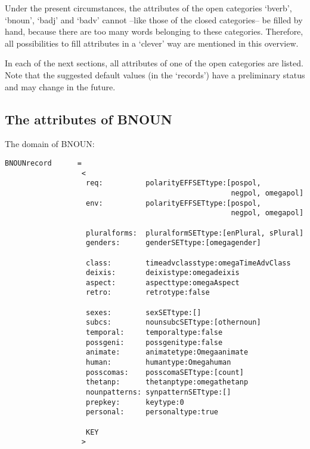Under the present circumstances, the attributes of the open categories `bverb',
`bnoun', `badj' and `badv' cannot 
--like those of the closed categories-- be filled by hand, because there are 
too many words belonging to these categories. Therefore, all possibilities to
fill attributes in a `clever' way are mentioned in this overview. 
 
In each of the next sections, all attributes of one of the open categories are 
listed. Note that the suggested default values (in the `records') 
have a preliminary status and may change in the future. 
 
\subsection{The attributes of BNOUN}
 
The domain of BNOUN:
 
\begin{verbatim}
BNOUNrecord      =
                  <
                   req:          polarityEFFSETtype:[pospol, 
                                                     negpol, omegapol]
                   env:          polarityEFFSETtype:[pospol, 
                                                     negpol, omegapol]
 
                   pluralforms:  pluralformSETtype:[enPlural, sPlural]
                   genders:      genderSETtype:[omegagender]  
 
                   class:        timeadvclasstype:omegaTimeAdvClass
                   deixis:       deixistype:omegadeixis
                   aspect:       aspecttype:omegaAspect
                   retro:        retrotype:false
 
                   sexes:        sexSETtype:[]                        
                   subcs:        nounsubcSETtype:[othernoun]
                   temporal:     temporaltype:false
                   possgeni:     possgenitype:false
                   animate:      animatetype:Omegaanimate
                   human:        humantype:Omegahuman                 
                   posscomas:    posscomaSETtype:[count]
                   thetanp:      thetanptype:omegathetanp
                   nounpatterns: synpatternSETtype:[]
                   prepkey:      keytype:0
                   personal:     personaltype:true
 
                   KEY              
                  >
\end{verbatim}
 
